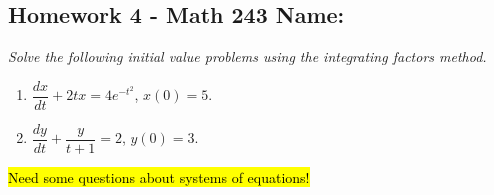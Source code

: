 \documentclass[10pt]{article}
\begin{document}
\pagestyle{empty}
\subsection*{Homework 4 - Math 243 \hfill Name: \underline{\hspace*{2in}}}


\noindent
%
%
%
%

\noindent
\textit{Solve the following initial value problems using the integrating factors method.}

\begin{multicols}{2}
\begin{enumerate}
\setcounter{enumi}{\theenumCount}
\item $\dfrac{dx}{dt} + 2tx = 4 e^{-t^2}$, $x(0) = 5$.


\item $\dfrac{dy}{dt} + \dfrac{y}{t+1} = 2$, $y(0) = 3$.

\setcounter{enumCount}{\theenumi}
\end{enumerate} 
\end{multicols}
\vfill



\hl{Need some questions about systems of equations!}
\vfill
\end{document}
